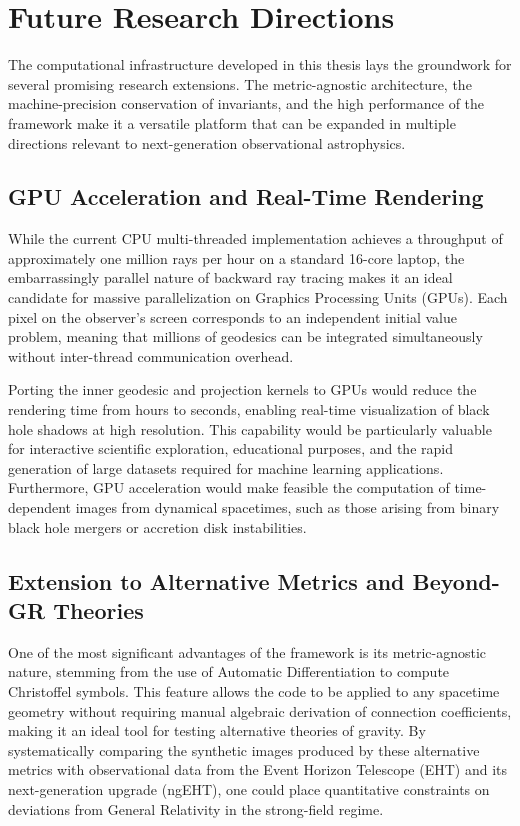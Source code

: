 \documentclass[11pt]{book}
\begin{document}
\section{Future Research Directions}

The computational infrastructure developed in this thesis lays the groundwork for several promising research extensions. The metric-agnostic architecture, the machine-precision conservation of invariants, and the high performance of the framework make it a versatile platform that can be expanded in multiple directions relevant to next-generation observational astrophysics.

\subsection{GPU Acceleration and Real-Time Rendering}

While the current CPU multi-threaded implementation achieves a throughput of approximately one million rays per hour on a standard 16-core laptop, the embarrassingly parallel nature of backward ray tracing makes it an ideal candidate for massive parallelization on Graphics Processing Units (GPUs). Each pixel on the observer's screen corresponds to an independent initial value problem, meaning that millions of geodesics can be integrated simultaneously without inter-thread communication overhead.

Porting the inner geodesic and projection kernels to GPUs would reduce the rendering time from hours to seconds, enabling real-time visualization of black hole shadows at high resolution. This capability would be particularly valuable for interactive scientific exploration, educational purposes, and the rapid generation of large datasets required for machine learning applications. Furthermore, GPU acceleration would make feasible the computation of time-dependent images from dynamical spacetimes, such as those arising from binary black hole mergers or accretion disk instabilities.

\subsection{Extension to Alternative Metrics and Beyond-GR Theories}

One of the most significant advantages of the framework is its metric-agnostic nature, stemming from the use of Automatic Differentiation to compute Christoffel symbols. This feature allows the code to be applied to any spacetime geometry without requiring manual algebraic derivation of connection coefficients, making it an ideal tool for testing alternative theories of gravity.
By systematically comparing the synthetic images produced by these alternative metrics with observational data from the Event Horizon Telescope (EHT) and its next-generation upgrade (ngEHT), one could place quantitative constraints on deviations from General Relativity in the strong-field regime.
\end{document}
